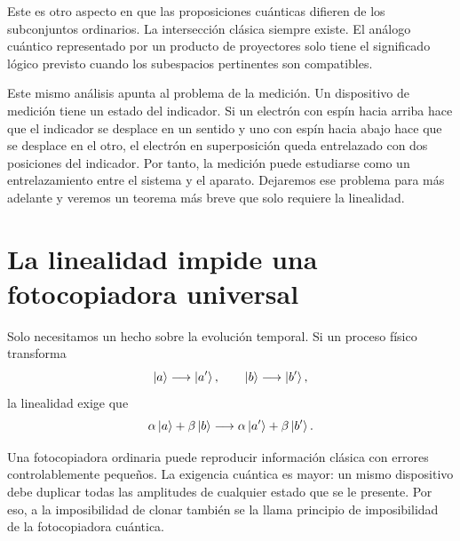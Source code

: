 Este es otro aspecto en que las proposiciones cuánticas difieren de los subconjuntos ordinarios. La intersección clásica siempre existe. El análogo cuántico representado por un producto de proyectores solo tiene el significado lógico previsto cuando los subespacios pertinentes son compatibles.

Este mismo análisis apunta al problema de la medición. Un dispositivo de medición tiene un estado del indicador. Si un electrón con espín hacia arriba hace que el indicador se desplace en un sentido y uno con espín hacia abajo hace que se desplace en el otro, el electrón en superposición queda entrelazado con dos posiciones del indicador. Por tanto, la medición puede estudiarse como un entrelazamiento entre el sistema y el aparato. Dejaremos ese problema para más adelante y veremos un teorema más breve que solo requiere la linealidad.

\begin{classroomqa}
\end{classroomqa}

\section{La linealidad impide una fotocopiadora universal}

Solo necesitamos un hecho sobre la evolución temporal. Si un proceso físico transforma
\begin{equation}
  \left\lvert a\right\rangle\longrightarrow\left\lvert a'\right\rangle,
  \qquad
  \left\lvert b\right\rangle\longrightarrow\left\lvert b'\right\rangle,
\end{equation}
la linealidad exige que
\begin{equation}
  \alpha\left\lvert a\right\rangle+\beta\left\lvert b\right\rangle
  \longrightarrow
  \alpha\left\lvert a'\right\rangle+\beta\left\lvert b'\right\rangle.
  \label{eq:l05-linearity}
\end{equation}

Una fotocopiadora ordinaria puede reproducir información clásica con errores controlablemente pequeños. La exigencia cuántica es mayor: un mismo dispositivo debe duplicar todas las amplitudes de cualquier estado que se le presente. Por eso, a la imposibilidad de clonar también se la llama principio de imposibilidad de la fotocopiadora cuántica.

